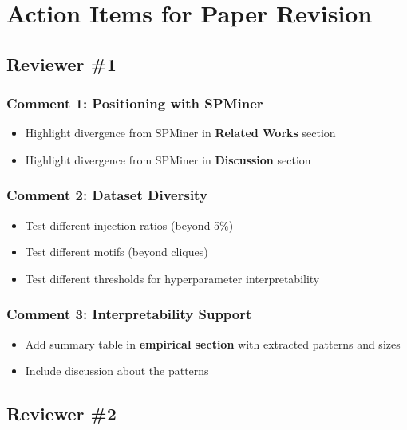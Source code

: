\section*{Action Items for Paper Revision}

\subsection*{Reviewer \#1}

\subsubsection*{Comment 1: Positioning with SPMiner}
\begin{itemize}
    \item[$\square$] Highlight divergence from SPMiner in \textbf{Related Works} section
    \item[$\square$] Highlight divergence from SPMiner in \textbf{Discussion} section
\end{itemize}

\subsubsection*{Comment 2: Dataset Diversity}
\begin{itemize}
    \item[$\square$] Test different injection ratios (beyond 5\%)
    \item[$\square$] Test different motifs (beyond cliques)
    \item[$\square$] Test different thresholds for hyperparameter interpretability
\end{itemize}

\subsubsection*{Comment 3: Interpretability Support}
\begin{itemize}
    \item[$\square$] Add summary table in \textbf{empirical section} with extracted patterns and sizes
    \item[$\square$] Include discussion about the patterns
\end{itemize}

\subsection*{Reviewer \#2}

